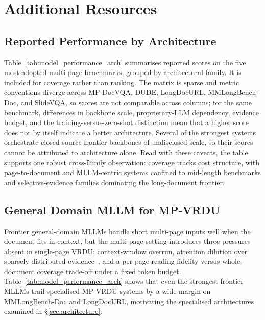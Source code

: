 

\section{Additional Resources}

\subsection{Reported Performance by Architecture}
\label{app:performance}



Table~\ref{tab:model_performance_arch} summarises reported scores on the five most-adopted multi-page benchmarks, grouped by architectural family. It is included for coverage rather than ranking. The matrix is sparse and metric conventions diverge across MP-DocVQA, DUDE, LongDocURL, MMLongBench-Doc, and SlideVQA, so scores are not comparable across columns; for the same benchmark, differences in backbone scale, proprietary-LLM dependency, evidence budget, and the training-versus-zero-shot distinction mean that a higher score does not by itself indicate a better architecture. Several of the strongest systems orchestrate closed-source frontier backbones of undisclosed scale, so their scores cannot be attributed to architecture alone. Read with these caveats, the table supports one robust cross-family observation: coverage tracks cost structure, with page-to-document and MLLM-centric systems confined to mid-length benchmarks and selective-evidence families dominating the long-document frontier.

\subsection{General Domain MLLM for MP-VRDU}
\label{app:general-MLLM}
Frontier general-domain MLLMs handle short multi-page inputs well when the document fits in context, but the multi-page setting introduces three pressures absent in single-page VRDU: context-window overrun, attention dilution over sparsely distributed evidence~\cite{liu2024lost}, and a per-page reading fidelity versus whole-document coverage trade-off under a fixed token budget. Table~\ref{tab:model_performance_arch} shows that even the strongest frontier MLLMs trail specialised MP-VRDU systems by a wide margin on MMLongBench-Doc and LongDocURL, motivating the specialised architectures examined in \S\ref{sec:architecture}.

